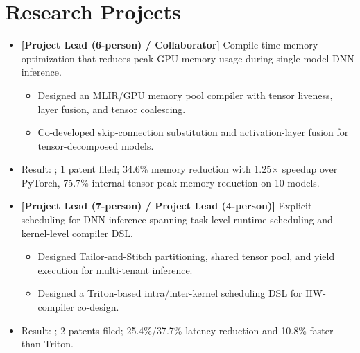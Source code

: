 \documentclass{cv}
\begin{document}
\section{Research Projects}

 
\begin{itemize}
  \item \textbf{[Project Lead (6-person) / Collaborator]} Compile-time memory optimization that reduces peak GPU memory usage during single-model DNN inference.
  \begin{itemize}
    \item Designed an MLIR/GPU memory pool compiler with tensor liveness, layer fusion, and tensor coalescing.
    \item Co-developed skip-connection substitution and activation-layer fusion for tensor-decomposed models.
  \end{itemize}
  \item Result: ; 1 patent filed; 34.6\% memory reduction with 1.25$\times$ speedup over PyTorch, 75.7\% internal-tensor peak-memory reduction on 10 models.
\end{itemize}

\vspace{0.4em}

 
\begin{itemize}
  \item \textbf{[Project Lead (7-person) / Project Lead (4-person)]} Explicit scheduling for DNN inference spanning task-level runtime scheduling and kernel-level compiler DSL.
  \begin{itemize}
    \item Designed Tailor-and-Stitch partitioning, shared tensor pool, and yield execution for multi-tenant inference.
    \item Designed a Triton-based intra/inter-kernel scheduling DSL for HW-compiler co-design.
  \end{itemize}
  \item Result: ; 2 patents filed; 25.4\%/37.7\% latency reduction and 10.8\% faster than Triton.
\end{itemize}

\vspace{0.4em}
\end{document}
